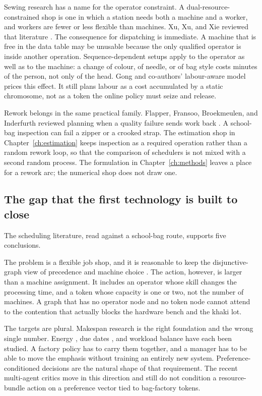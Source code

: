Sewing research has a name for the operator constraint. A dual-resource-constrained shop is one in which a station needs both a machine and a worker, and workers are fewer or less flexible than machines. Xu, Xu, and Xie reviewed that literature \cite{xu2011}. The consequence for dispatching is immediate. A machine that is free in the data table may be unusable because the only qualified operator is inside another operation. Sequence-dependent setups apply to the operator as well as to the machine: a change of colour, of needle, or of bag style costs minutes of the person, not only of the head. Gong and co-authors' labour-aware model \cite{gong2019} prices this effect. It still plans labour as a cost accumulated by a static chromosome, not as a token the online policy must seize and release.

Rework belongs in the same practical family. Flapper, Fransoo, Broekmeulen, and Inderfurth reviewed planning when a quality failure sends work back \cite{flapper2002}. A school-bag inspection can fail a zipper or a crooked strap. The estimation shop in Chapter~\ref{ch:estimation} keeps inspection as a required operation rather than a random rework loop, so that the comparison of schedulers is not mixed with a second random process. The formulation in Chapter~\ref{ch:methods} leaves a place for a rework arc; the numerical shop does not draw one.

\subsection{The gap that the first technology is built to close}

The scheduling literature, read against a school-bag route, supports five conclusions.

The problem is a flexible job shop, and it is reasonable to keep the disjunctive-graph view of precedence and machine choice \cite{roy1964,song2023}. The action, however, is larger than a machine assignment. It includes an operator whose skill changes the processing time, and a token whose capacity is one or two, not the number of machines. A graph that has no operator node and no token node cannot attend to the contention that actually blocks the hardware bench and the khaki lot.

The targets are plural. Makespan research \cite{brandimarte1993,pezzella2008,zhang2020,song2023} is the right foundation and the wrong single number. Energy \cite{mouzon2007,dai2019,gong2019,wang2025}, due dates \cite{vepsalainen1987,zeng2025}, and workload balance \cite{kacem2002,chen2024,gong2019} have each been studied. A factory policy has to carry them together, and a manager has to be able to move the emphasis without training an entirely new system. Preference-conditioned decisions are the natural shape of that requirement. The recent multi-agent critics \cite{wang2025,li2025,zeng2025} move in this direction and still do not condition a resource-bundle action on a preference vector tied to bag-factory tokens.

